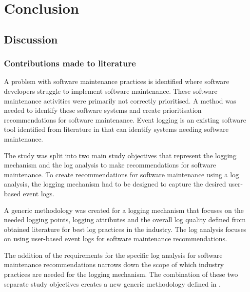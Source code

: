 \chapter{Conclusion}
\label{chap:4}

\section{Discussion}

\subsection{Contributions made to literature}
A problem with software maintenance practices is identified where software developers struggle to
implement software maintenance. These software maintenance activities were primarily not correctly
prioritised. A method was needed to identify these software systems and create prioritisation
recommendations for software maintenance. Event logging is an existing software tool 
identified from literature in  that can identify systems needing software
maintenance. \par The study was split into two main study objectives that represent the logging
mechanism and the log analysis to make recommendations for software maintenance. To create
recommendations for software maintenance using a log analysis, the logging mechanism had to be
designed to capture the desired user-based event logs. \par A generic methodology was created for a
logging mechanism that focuses on the needed logging points, logging attributes and the overall log
quality defined from obtained literature for best log practices in the industry. The log analysis focuses on using user-based event logs for software maintenance recommendations.\par The
addition of the requirements for the specific log analysis for software maintenance recommendations
narrows down the scope of which industry practices are needed for the logging mechanism. The
combination of these two separate study objectives creates a new generic methodology defined in
.

